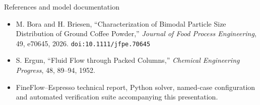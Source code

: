 \documentclass[aspectratio=169,11pt]{beamer}
\newcommand{\takeaway}[1]{%
  \begin{beamercolorbox}[rounded=true,sep=.55em]{block body}
    \centering\color{tumdark}\textbf{#1}
  \end{beamercolorbox}}
\begin{document}
\begin{frame}{References and model documentation}
 \small
 \begin{itemize}
  \item M. Bora and H. Briesen, ``Characterization of Bimodal Particle Size Distribution of Ground Coffee Powder,'' \emph{Journal of Food Process Engineering}, 49, e70645, 2026. \texttt{doi:10.1111/jfpe.70645}
  \item S. Ergun, ``Fluid Flow through Packed Columns,'' \emph{Chemical Engineering Progress}, 48, 89--94, 1952.
  \item FineFlow--Espresso technical report, Python solver, named-case configuration and automated verification suite accompanying this presentation.
 \end{itemize}
\end{frame}
\end{document}
